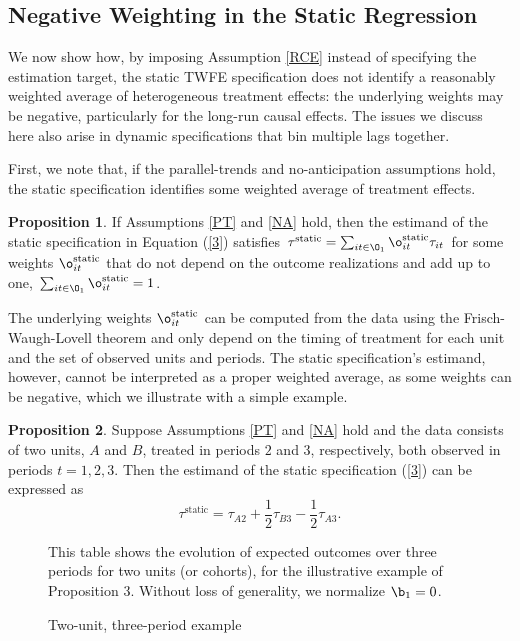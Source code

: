 \documentclass[12pt]{article}
\theoremstyle{definition}
\newtheorem{proposition}{Proposition}
\begin{document}
\subsection{Negative Weighting in the Static Regression}

We now show how, by imposing Assumption \ref{RCE} instead of specifying the estimation target, the static TWFE specification does not identify a reasonably weighted average of heterogeneous treatment effects: the underlying weights may be negative, particularly for the long-run causal effects. The issues we discuss here also arise in dynamic specifications that bin multiple lags together. 

First, we note that, if the parallel-trends and no-anticipation assumptions hold, the static specification identifies some weighted average of treatment effects.
\begin{proposition}
    If Assumptions \ref{PT} and \ref{NA} hold, then the estimand of the static specification in Equation (\ref{3}) satisfies $\tau^{\text{static}} = \sum_{it \in \O_1} \o_{it}^{\text{static}} \tau_{it}$ for some weights $\o_{it}^{\text{static}}$ that do not depend on the outcome realizations and add up to one, $\sum_{it \in \O_1} \o_{it}^{\text{static}} = 1$.
\end{proposition}

The underlying weights $\o_{it}^{\text{static}}$ can be computed from the data using the Frisch-Waugh-Lovell theorem and only depend on the timing of treatment for each unit and the set of observed units and periods. The static specification's estimand, however, cannot be interpreted as a proper weighted average, as some weights can be negative, which we illustrate with a simple example. 

\begin{proposition}
    Suppose Assumptions \ref{PT} and \ref{NA} hold and the data consists of two units, $A$ and $B$, treated in periods $2$ and $3$, respectively, both observed in periods $t=1,2,3$. Then the estimand of the static specification (\ref{3}) can be expressed as 
    $$
    \tau^{\text{static}} = \tau_{A2} + \frac{1}{2} \tau_{B3} - \frac{1}{2} \tau_{A3}.
    $$
\end{proposition}


\begin{figure}[H]
    \noindent\caption{Two-unit, three-period example}
    \begin{center}
    \end{center}
    \medskip
    {\footnotesize This table shows the evolution of expected outcomes over three periods for two units (or cohorts), for the illustrative example of Proposition 3. Without loss of generality, we normalize $\b_1 = 0$.}
    \label{borusyakRevisitingEventStudyDesigns2024_tab1}
\end{figure}
\end{document}
